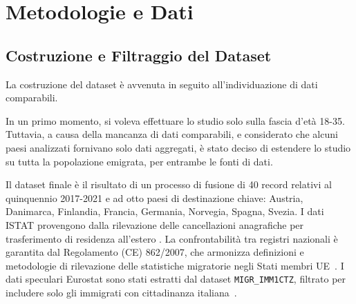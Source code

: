 \section{Metodologie e Dati}\label{sec:metodologie_dati}

\subsection{Costruzione e Filtraggio del Dataset}
La costruzione del dataset è avvenuta in seguito all'individuazione di dati comparabili.

In un primo momento, si voleva effettuare lo studio solo sulla fascia d'età 18-35.
Tuttavia, a causa della mancanza di dati comparabili, e considerato che alcuni paesi analizzati fornivano solo dati aggregati, è stato deciso di estendere lo studio su tutta la popolazione emigrata, per entrambe le fonti di dati.

Il dataset finale è il risultato di un processo di fusione di 40 record relativi al quinquennio 2017-2021 e ad otto paesi di destinazione chiave: Austria, Danimarca, Finlandia, Francia, Germania, Norvegia, Spagna, Svezia.
I dati ISTAT provengono dalla rilevazione delle cancellazioni anagrafiche per trasferimento di residenza all'estero \cite{istat_iscrizioni}.
La confrontabilità tra registri nazionali è garantita dal Regolamento (CE) 862/2007, che armonizza definizioni e metodologie di rilevazione delle statistiche migratorie negli Stati membri UE~\cite{ec_regulation_862_2007}.
I dati speculari Eurostat sono stati estratti dal dataset \texttt{MIGR\_IMM1CTZ}, filtrato per includere solo gli immigrati con cittadinanza italiana~\cite{eurostat_migr_imm1ctz}.

